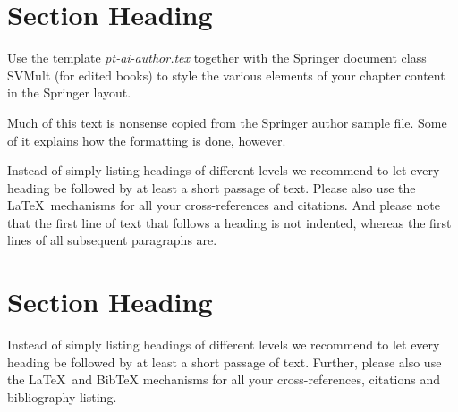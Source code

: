 \documentclass[graybox]{svmult}
\begin{document}

\section{Section Heading}
\label{sec:1}

Use the template \emph{pt-ai-author.tex} together with the Springer document class
SVMult (for edited books) to style the various elements of your chapter content in
the Springer layout.

Much of this text is nonsense copied from the Springer author sample file. Some of it
explains how the formatting is done, however.

Instead of simply listing headings of different levels we recommend to let every
heading be followed by at least a short passage of text. Please also use the \LaTeX\
mechanisms for all your cross-references and citations. And please note that the
first line of text that follows a heading is not indented, whereas the first lines of
all subsequent paragraphs are.

\section{Section Heading}
\label{sec:2}
Instead of simply listing headings of different levels we recommend to
let every heading be followed by at least a short passage of text.
Further, please also use the \LaTeX\ and BibTeX mechanisms for all your
cross-references, citations and bibliography listing.
\end{document}
